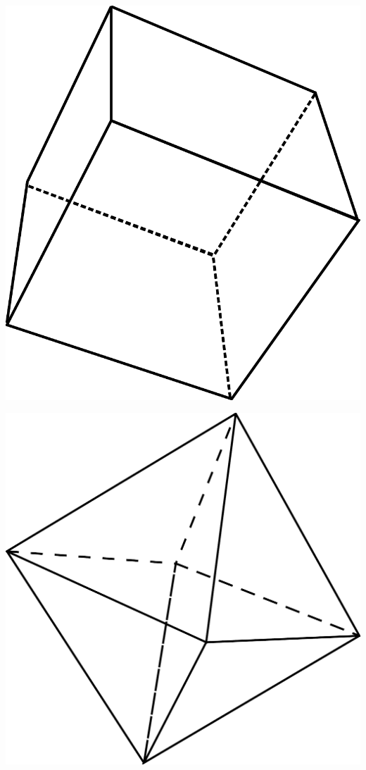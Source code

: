 \documentclass[a4paper,11pt]{report}
\begin{document}
\begin{exop}
{\begin{tasks}[after-item-skip = 0.4em]
	\includegraphics[scale=0.25]{media/es-21/tp3}
	\vspace{-2cm}
	\task 

	\includegraphics[scale=0.17]{media/es-21/tp4}
	\task 


\end{tasks}}
\end{exop}
\end{document}
